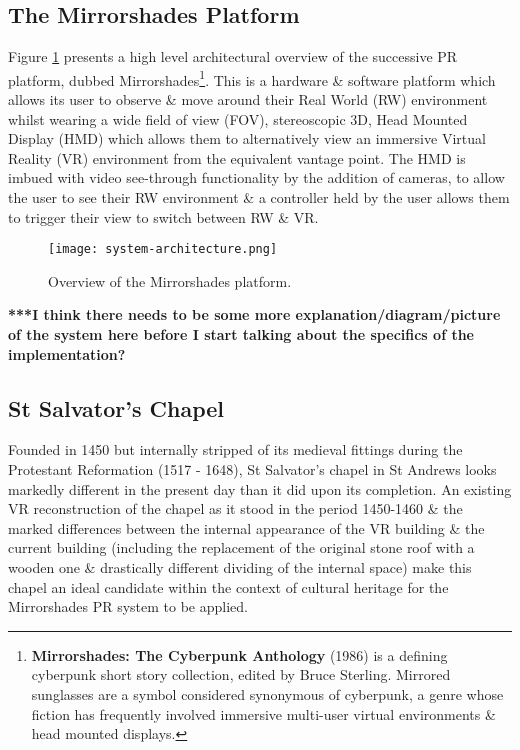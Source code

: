 \subsection{The Mirrorshades Platform}

Figure \ref{systemarchitecture} presents a high level architectural overview of the successive PR platform, dubbed Mirrorshades\footnote{\textbf{Mirrorshades: The Cyberpunk Anthology} (1986) is a defining cyberpunk short story collection, edited by Bruce Sterling. Mirrored sunglasses are a symbol considered synonymous of cyberpunk, a genre whose fiction has frequently involved immersive multi-user virtual environments \& head mounted displays.}. This is a hardware \& software platform which allows its user to observe \& move around their Real World (RW) environment whilst wearing a wide field of view (FOV), stereoscopic 3D, Head Mounted Display (HMD) which allows them to alternatively view an immersive Virtual Reality (VR) environment from the equivalent vantage point. The HMD is imbued with video see-through functionality by the addition of cameras, to allow the user to see their RW environment \& a controller held by the user allows them to trigger their view to switch between RW \& VR.

\begin{figure}[h]
	\begin{center}
		\texttt{[image: system-architecture.png]}
		\caption{Overview of the Mirrorshades platform.}
		\label{systemarchitecture}
	\end{center}
\end{figure}

\textbf{***I think there needs to be some more explanation/diagram/picture of the system here before I start talking about the specifics of the implementation?}


\subsection{St Salvator's Chapel}

Founded in 1450 but internally stripped of its medieval fittings during the Protestant Reformation (1517 - 1648), St Salvator's chapel in St Andrews looks markedly different in the present day than it did upon its completion. An existing VR reconstruction of the chapel as it stood in the period 1450-1460 \& the marked differences between the internal appearance of the VR building \& the current building (including the replacement of the original stone roof with a wooden one \& drastically different dividing of the internal space) make this chapel an ideal candidate within the context of cultural heritage for the Mirrorshades PR system to be applied.

